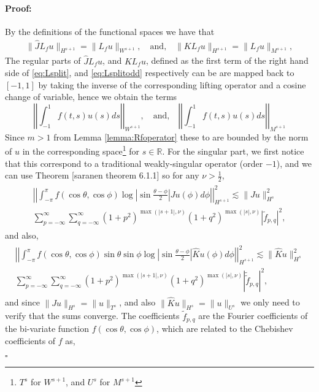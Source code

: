 \documentclass{article}
\newenvironment{proof}{\paragraph{Proof:}}{\hfill$\square$}
\newcommand{\todo}[1]{{\color{red}[#1]}}
\newcommand{\IR}{{\mathbb R}}
\begin{document}
\begin{proof}
By the definitions of the functional spaces we have that 
\begin{align*}
\| \widehat{J} L_f u \|_{H^{s+1}} = \|L_f u  \|_{W^{s+1}},\quad \text{and,} \quad \| KL_f u \|_{H^{s+1}} = \|L_f u \|_{M^{s+1}},
\end{align*}
The regular parts of $\widehat{J} L_f u$, and $K L_f u$, defined as the first term of the right hand side of \eqref{eq:Lsplit}, and \eqref{eq:Lsplitodd} respectively can be are mapped back to $[-1,1]$ by taking the inverse of the corresponding lifting operator and a cosine change of variable, hence we obtain the terms 
$$
\left\vert \left \vert
 \int_{-1}^{1} f(t , s) u(s) ds 
 \right\vert\right\vert_{W^{s+1}}, \quad \text{and,} \quad \left\vert \left \vert
 \int_{-1}^{1} f(t , s) u(s) ds 
 \right\vert\right\vert_{M^{s+1}}
$$
Since $m>1$ from Lemma \ref{lemma:Rfoperator} these to are bounded by the norm of $u$ in the corresponding space\footnote{$T^s$ for $W^{s+1}$, and $U^s$ for $M^{s+1}$} for $s \in \IR$. For the singular part, we first notice that this correspond to a traditional weakly-singular operator (order $-1$), and we  can use Theorem \todo{saranen theorem 6.1.1} so for any $\nu >\frac{1}{2}$,
\begin{align}
\label{eq:condS}
\begin{split}
\left\vert \left\vert \int_{-\pi}^{\pi} f(\cos \theta, \cos \phi) \log \left\vert \sin \frac{\theta-\phi}{2} \right\vert Ju(\phi) d\phi  \right\vert \right\vert_{H^{s+1}}^2\lesssim  \|J u\|_{H^s}^2\\
\sum_{p=-\infty}^{\infty} \sum_{q = -\infty}^\infty (1+p^2)^{\max(|s+1|,\nu)}(1+q^2)^{\max(|s|,\nu)} | \widetilde{f}_{p,q}|^2,
\end{split}
\end{align}
and also,
\begin{align}
\label{eq:condSodd}
\begin{split}
\left\vert \left\vert \int_{-\pi}^{\pi} f(\cos \theta, \cos \phi) \sin \theta \sin \phi \log \left\vert \sin \frac{\theta-\phi}{2} \right\vert \widehat{K}u(\phi) d\phi  \right\vert \right\vert_{H^{s+1}}^2\lesssim  \|\widehat{K} u\|_{H^s}^2\\
\sum_{p=-\infty}^{\infty} \sum_{q = -\infty}^\infty (1+p^2)^{\max(|s+1|,\nu)}(1+q^2)^{\max(|s|,\nu)} | \widetilde{\widetilde{f}}_{p,q}|^2,
\end{split}
\end{align}
and since $\|Ju\|_{H^s} = \|u \|_{T^s}$, and also $\|\widehat{K} u \|_{H^s} = \|u\|_{U^s}$ we only need to verify that the sums converge. The coefficients $\widetilde{f}_{p,q}$ are the Fourier coefficients of the bi-variate function $f(\cos \theta, \cos \phi)$, which are related to the Chebishev coefficients of $f$ as, 

\end{proof}
\end{document}

